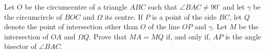 Let $O$ be the circumcentre of a triangle $ABC$ such that $\angle BAC \neq 90^\circ$ and let $\gamma$
be the circumcircle of $BOC$ and $\Omega$ its centre. If $P$ is a point of the side $BC$, let $Q$ denote the point of intersection other than $O$ of the line $OP$ and $\gamma$. Let $M$ be the intersection of $OA$ and $\Omega Q$. Prove that $MA = MQ$ if, and only if, $AP$ is the angle bisector of $\angle BAC$.
